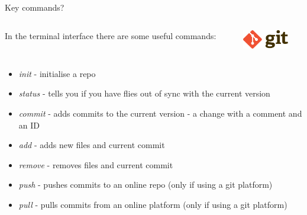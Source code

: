 \documentclass[10pt]{beamer}
\begin{document}
\begin{frame}[fragile]{Key commands?}
\begin{columns}[T]
\begin{column}{.8\textwidth}
In the terminal interface there are some useful commands:
\end{column}
\begin{column}{.2\textwidth}
\includegraphics[width=2cm]{Figs/Git-logo}
\end{column}
\end{columns}
\begin{itemize}
\item \textit{init} - initialise a repo
\item \textit{status} - tells you if you have flies out of sync with the current version
\item \textit{commit} - adds commits to the current version - a change with a comment and an ID
\item \textit{add} - adds new files and current commit
\item \textit{remove} - removes files and current commit
\item \textit{push} - pushes commits to an online repo (only if using a git platform)
\item \textit{pull} - pulls commits from an online platform (only if using a git platform)
\end{itemize}
\end{frame}
\end{document}
